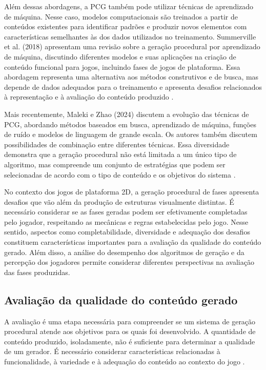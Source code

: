 Além dessas abordagens, a PCG também pode utilizar
técnicas de aprendizado de máquina. Nesse caso, modelos
computacionais são treinados a partir de conteúdos
existentes para identificar padrões e produzir novos
elementos com características semelhantes às dos dados
utilizados no treinamento. Summerville et al. (2018)
apresentam uma revisão sobre a geração procedural por
aprendizado de máquina, discutindo diferentes modelos
e suas aplicações na criação de conteúdo funcional
para jogos, incluindo fases de jogos de plataforma.
Essa abordagem representa uma alternativa aos métodos
construtivos e de busca, mas depende de dados adequados
para o treinamento e apresenta desafios relacionados
à representação e à avaliação do conteúdo produzido
\cite{Summerville2018}.

Mais recentemente, Maleki e Zhao (2024) discutem a
evolução das técnicas de PCG, abordando métodos baseados
em busca, aprendizado de máquina, funções de ruído
e modelos de linguagem de grande escala. Os autores
também discutem possibilidades de combinação entre
diferentes técnicas. Essa diversidade demonstra que
a geração procedural não está limitada a um único
tipo de algoritmo, mas compreende um conjunto de
estratégias que podem ser selecionadas de acordo
com o tipo de conteúdo e os objetivos do sistema 
\cite{MalekiZhao2024}.

No contexto dos jogos de plataforma 2D, a geração procedural de fases 
apresenta desafios que vão além da produção de estruturas visualmente 
distintas. É necessário considerar se as fases geradas podem ser 
efetivamente completadas pelo jogador, respeitando as mecânicas e 
regras estabelecidas pelo jogo. Nesse sentido, aspectos como 
completabilidade, diversidade e adequação dos desafios constituem 
características importantes para a avaliação da qualidade do conteúdo 
gerado. Além disso, a análise do desempenho dos algoritmos de geração 
e da percepção dos jogadores permite considerar diferentes perspectivas 
na avaliação das fases produzidas.

\subsection{Avaliação da qualidade do conteúdo gerado}

A avaliação é uma etapa necessária para compreender se
um sistema de geração procedural atende aos objetivos
para os quais foi desenvolvido. A quantidade de conteúdo
produzido, isoladamente, não é suficiente para determinar
a qualidade de um gerador. É necessário considerar
características relacionadas à funcionalidade, à variedade
e à adequação do conteúdo ao contexto do jogo
\cite{ShakerSmithYannakakis2016,Khalifa2025}.


